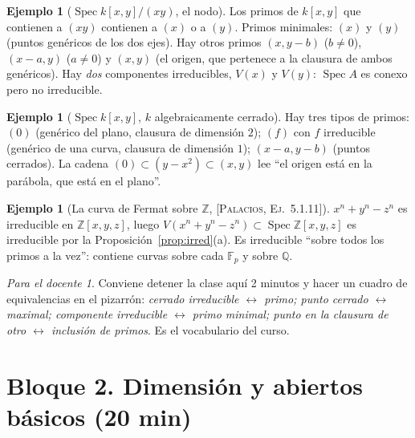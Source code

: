 \documentclass[11pt,a4paper]{article}
\newcommand{\Spec}{\operatorname{Spec}}
\newcommand{\ZZ}{\mathbb{Z}}
\newcommand{\QQ}{\mathbb{Q}}
\newcommand{\FF}{\mathbb{F}}
\theoremstyle{plain}
\theoremstyle{definition}
\newtheorem{ejemplo}[teorema]{Ejemplo}
\theoremstyle{remark}
\newtheorem*{docente}{Para el docente}
\newcounter{ej}
\newcommand{\libro}[1]{\textsc{[Palacios, #1]}}
\begin{document}
\begin{ejemplo}[{$\Spec k[x,y]/(xy)$, el nodo}]\label{ej:nodo5}
Los primos de $k[x,y]$ que contienen a $(xy)$ contienen a $(x)$ o a $(y)$. Primos minimales: $(x)$ y $(y)$ (puntos genéricos de los dos ejes). Hay otros primos $(x,y-b)$ ($b\ne0$), $(x-a,y)$ ($a\ne0$) y $(x,y)$ (el origen, que pertenece a la clausura de ambos genéricos). Hay \emph{dos} componentes irreducibles, $V(x)$ y $V(y)$: $\Spec A$ es conexo pero no irreducible.
\begin{center}
\end{center}
\end{ejemplo}

\begin{ejemplo}[{$\Spec k[x,y]$, $k$ algebraicamente cerrado}]\label{ej:plano5}
Hay tres tipos de primos: $(0)$ (genérico del plano, clausura de dimensión $2$); $(f)$ con $f$ irreducible (genérico de una curva, clausura de dimensión $1$); $(x-a,y-b)$ (puntos cerrados). La cadena $(0)\subset(y-x^2)\subset(x,y)$ lee ``el origen está en la parábola, que está en el plano''.
\end{ejemplo}

\begin{ejemplo}[{La curva de Fermat sobre $\ZZ$, \libro{Ej.~5.1.11}}]
$x^n+y^n-z^n$ es irreducible en $\ZZ[x,y,z]$, luego $V(x^n+y^n-z^n)\subset\Spec\ZZ[x,y,z]$ es irreducible por la Proposición~\ref{prop:irred}(a). Es irreducible ``sobre todos los primos a la vez'': contiene curvas sobre cada $\FF_p$ y sobre $\QQ$.
\end{ejemplo}

\begin{docente}
Conviene detener la clase aquí 2 minutos y hacer un cuadro de equivalencias en el pizarrón: \emph{cerrado irreducible $\leftrightarrow$ primo; punto cerrado $\leftrightarrow$ maximal; componente irreducible $\leftrightarrow$ primo minimal; punto en la clausura de otro $\leftrightarrow$ inclusión de primos}. Es el vocabulario del curso.
\end{docente}

\section{Bloque 2. Dimensión y abiertos básicos (20 min)}
\end{document}
